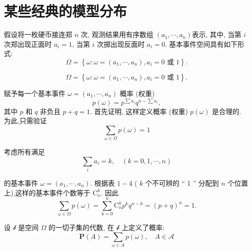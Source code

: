 \section{某些经典的模型分布}

 假设将一枚硬币接连郑 $n$ 次, 观测结果用有序数组 $\left(a_1, \cdots, a_n\right)$表示, 其中, 当第 $i$ 次郑出现正面时 $a_i=1$, 当第 $i$ 次掷出现反面时 $a_i=0$. 基本事件空间具有如下形式:
$$
\Omega=\left\{\omega: \omega=\left(a_1, \cdots, a_n\right), a_i=0 \text { 或 } 1\right\} .
$$

$$
\Omega=\left\{\omega: \omega=\left(a_1, \cdots, a_n\right), a_i=0 \text { 或 } 1\right\} .
$$

赋予每一个基本事件 $\omega=\left(a_1, \cdots, a_n\right)$ 概率 (权重)
$$
p(\omega)=p^{\sum a_i} q^{n-\sum a_i},
$$
其中 $p$ 和 $q$ 非负且 $p+q=1$. 首先证明, 这样定义概率 (权重) $p(\omega)$ 是合理的. 为此,只需验证
$$
\sum_{\omega \in \Omega} p(\omega)=1
$$

考虑所有满足
$$
\sum_i a_i=k, \quad(k=0,1, \cdots, n)
$$

的基本事件 $\omega=\left(a_1, \cdots, a_n\right)$. 根据表 $1-4$ ( $k$ 个不可辨的 “ 1 ” 分配到 $n$ 个位置上),这样的基本事件个数等于 $\mathrm{C}_n^k$. 因此
$$
\sum_{\omega \in \Omega} p(\omega)=\sum_{k=0}^n \mathrm{C}_n^k p^k q^{n-k}=(p+q)^n=1 .
$$

设 $\mathscr{b}$ 是空间 $\Omega$ 的一切子集的代数, 在 $\mathscr{b}$ 上定义了概率:
$$
\mathbf{P}(A)=\sum_{\omega \in A} p(\omega), \quad A \in \mathscr{A}
$$